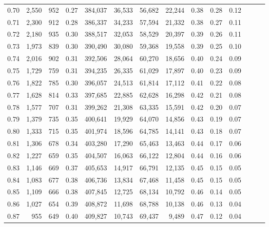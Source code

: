 \begin{tabular}{rrrrrrrrrrrrrr}
0.70 &   2,550 &    952 &  0.27 &  384,037 &   36,533 &  56,682 &  22,244 &  0.38 &  0.28 &      0.12 \\
0.71 &   2,300 &    912 &  0.28 &  386,337 &   34,233 &  57,594 &  21,332 &  0.38 &  0.27 &      0.11 \\
0.72 &   2,180 &    935 &  0.30 &  388,517 &   32,053 &  58,529 &  20,397 &  0.39 &  0.26 &      0.11 \\
0.73 &   1,973 &    839 &  0.30 &  390,490 &   30,080 &  59,368 &  19,558 &  0.39 &  0.25 &      0.10 \\
0.74 &   2,016 &    902 &  0.31 &  392,506 &   28,064 &  60,270 &  18,656 &  0.40 &  0.24 &      0.09 \\
0.75 &   1,729 &    759 &  0.31 &  394,235 &   26,335 &  61,029 &  17,897 &  0.40 &  0.23 &      0.09 \\
0.76 &   1,822 &    785 &  0.30 &  396,057 &   24,513 &  61,814 &  17,112 &  0.41 &  0.22 &      0.08 \\
0.77 &   1,628 &    814 &  0.33 &  397,685 &   22,885 &  62,628 &  16,298 &  0.42 &  0.21 &      0.08 \\
0.78 &   1,577 &    707 &  0.31 &  399,262 &   21,308 &  63,335 &  15,591 &  0.42 &  0.20 &      0.07 \\
0.79 &   1,379 &    735 &  0.35 &  400,641 &   19,929 &  64,070 &  14,856 &  0.43 &  0.19 &      0.07 \\
0.80 &   1,333 &    715 &  0.35 &  401,974 &   18,596 &  64,785 &  14,141 &  0.43 &  0.18 &      0.07 \\
0.81 &   1,306 &    678 &  0.34 &  403,280 &   17,290 &  65,463 &  13,463 &  0.44 &  0.17 &      0.06 \\
0.82 &   1,227 &    659 &  0.35 &  404,507 &   16,063 &  66,122 &  12,804 &  0.44 &  0.16 &      0.06 \\
0.83 &   1,146 &    669 &  0.37 &  405,653 &   14,917 &  66,791 &  12,135 &  0.45 &  0.15 &      0.05 \\
0.84 &   1,083 &    677 &  0.38 &  406,736 &   13,834 &  67,468 &  11,458 &  0.45 &  0.15 &      0.05 \\
0.85 &   1,109 &    666 &  0.38 &  407,845 &   12,725 &  68,134 &  10,792 &  0.46 &  0.14 &      0.05 \\
0.86 &   1,027 &    654 &  0.39 &  408,872 &   11,698 &  68,788 &  10,138 &  0.46 &  0.13 &      0.04 \\
0.87 &     955 &    649 &  0.40 &  409,827 &   10,743 &  69,437 &   9,489 &  0.47 &  0.12 &      0.04 \\

\end{tabular}
